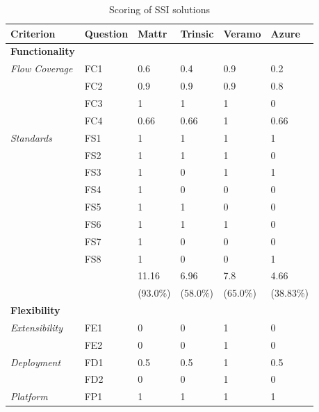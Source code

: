     \setlength\LTleft{0pt}
    \setlength\LTright{0pt}
    \begin{longtable}{@{\extracolsep{\fill}}llllll@{}}
        \caption{Scoring of \acs{SSI} solutions}
        \label{tab: scores}\\
        \toprule
        \textbf{Criterion}     & \textbf{Question} & \textbf{Mattr} & \textbf{Trinsic} & \textbf{Veramo} & \textbf{Azure} \\ \midrule
        \endfirsthead\endhead\endfoot\endlastfoot
        \textbf{Functionality} &&&&&\\
        \textit{Flow Coverage} & FC1 & 0.6 & 0.4 & 0.9 & 0.2 \\
                               & FC2 & 0.9 & 0.9 & 0.9 & 0.8 \\
                               & FC3 & 1 & 1 & 1 & 0 \\
                               & FC4 & 0.66 & 0.66 & 1 & 0.66 \\
        \textit{Standards}     & FS1 & 1 & 1 & 1 & 1 \\
                               & FS2 & 1 & 1 & 1 & 0 \\
                               & FS3 & 1 & 0 & 1 & 1 \\
                               & FS4 & 1 & 0 & 0 & 0 \\
                               & FS5 & 1 & 1 & 0 & 0 \\
                               & FS6 & 1 & 1 & 1 & 0 \\
                               & FS7 & 1 & 0 & 0 & 0 \\
                               & FS8 & 1 & 0 & 0 & 1 \\
                               \hline
                               && 11.16 & 6.96 & 7.8 & 4.66\\
                               && (93.0\%) & (58.0\%) & (65.0\%) & (38.83\%) \\                               
                               \midrule
        \textbf{Flexibility} &&&&&\\
        \textit{Extensibility} & FE1 & 0 & 0 & 1 & 0 \\
                               & FE2 & 0 & 0 & 1 & 0 \\
        \textit{Deployment}    & FD1 & 0.5 & 0.5 & 1 & 0.5 \\
                               & FD2 & 0 & 0 & 1 & 0 \\
        \textit{Platform}      & FP1 & 1 & 1 & 1 & 1 \\

\end{longtable}
